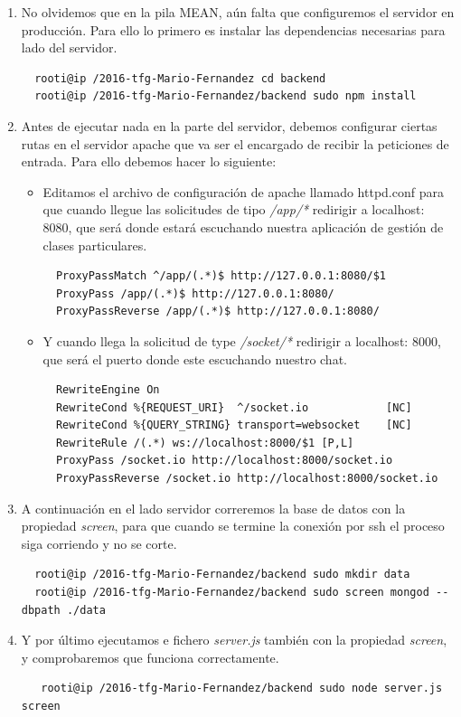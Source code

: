 \begin{enumerate}
  \item No olvidemos que en la pila MEAN, aún falta que configuremos el servidor en producción. Para ello lo primero es instalar las dependencias necesarias para lado del servidor.
  \begin{lstlisting}
  rooti@ip /2016-tfg-Mario-Fernandez cd backend
  rooti@ip /2016-tfg-Mario-Fernandez/backend sudo npm install
  \end{lstlisting}
  \item Antes de ejecutar nada en la parte del servidor, debemos configurar ciertas rutas en el servidor apache que va ser el encargado de recibir la peticiones de entrada. Para ello debemos hacer lo siguiente:
  \begin{itemize}

  \item  Editamos el archivo de configuración de apache llamado httpd.conf para que cuando llegue las solicitudes de tipo \textit{/app/*} redirigir a localhost: 8080, que será donde estará escuchando nuestra aplicación de gestión de clases particulares.
  \begin{lstlisting}
  ProxyPassMatch ^/app/(.*)$ http://127.0.0.1:8080/$1
  ProxyPass /app/(.*)$ http://127.0.0.1:8080/
  ProxyPassReverse /app/(.*)$ http://127.0.0.1:8080/
  \end{lstlisting}
  \item Y cuando llega la solicitud de type \textit{/socket/*} redirigir a localhost: 8000, que será el puerto donde este escuchando nuestro chat.
  \begin{lstlisting}
  RewriteEngine On
  RewriteCond %{REQUEST_URI}  ^/socket.io            [NC]
  RewriteCond %{QUERY_STRING} transport=websocket    [NC]
  RewriteRule /(.*) ws://localhost:8000/$1 [P,L]
  ProxyPass /socket.io http://localhost:8000/socket.io
  ProxyPassReverse /socket.io http://localhost:8000/socket.io
  \end{lstlisting}
  \end{itemize}

  \item A continuación en el lado servidor correremos la base de datos con la propiedad \textit{screen}, para que cuando se termine la conexión por ssh el proceso siga corriendo y no se corte.
  \begin{lstlisting}
  rooti@ip /2016-tfg-Mario-Fernandez/backend sudo mkdir data
  rooti@ip /2016-tfg-Mario-Fernandez/backend sudo screen mongod --dbpath ./data
  \end{lstlisting}
  \item Y por último ejecutamos e fichero \textit{server.js} también con la propiedad \textit{screen}, y comprobaremos que funciona correctamente.
  \begin{lstlisting}
   rooti@ip /2016-tfg-Mario-Fernandez/backend sudo node server.js screen
  \end{lstlisting}
\end{enumerate}
